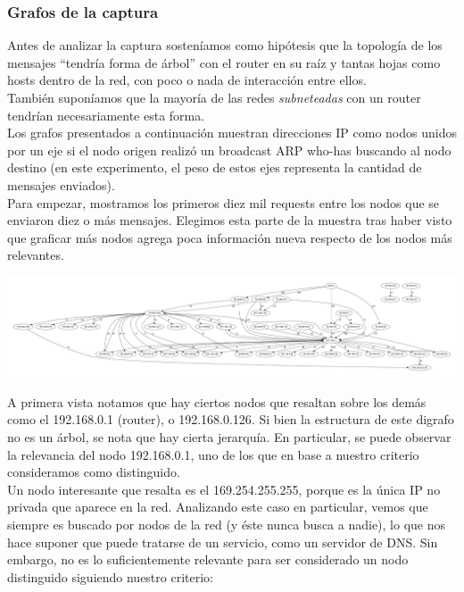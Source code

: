 \subsubsection{Grafos de la captura}

\indent \indent Antes de analizar la captura sosteníamos como hipótesis que la topología de los mensajes ``tendría forma de árbol'' con el router en su raíz y tantas hojas como hosts dentro de la red, con poco o nada de interacción entre ellos.\\
\indent También suponíamos que la mayoría de las redes \textit{subneteadas} con un router tendrían necesariamente esta forma.\\
\indent Los grafos presentados a continuación muestran direcciones IP como nodos unidos por un eje si el nodo origen realizó un broadcast ARP who-has buscando al nodo destino (en este experimento, el peso de estos ejes representa la cantidad de mensajes enviados).\\
\indent Para empezar, mostramos los primeros diez mil requests entre los nodos que se enviaron diez o más mensajes. Elegimos esta parte de la muestra tras haber visto que graficar más nodos agrega poca información nueva respecto de los nodos más relevantes.\\

\begin{center}
\includegraphics[scale=0.25,angle=90]{graphics/t-work-10000c-10w.png}
\end{center}

\indent A primera vista notamos que hay ciertos nodos que resaltan sobre los demás como el 192.168.0.1 (router), o 192.168.0.126. Si bien la estructura de este digrafo no es un árbol, se nota que hay cierta jerarquía. En particular, se puede observar la relevancia del nodo 192.168.0.1, uno de los que en base a nuestro criterio consideramos como distinguido.\\
\indent Un nodo interesante que resalta es el 169.254.255.255, porque es la única IP no privada que aparece en la red. Analizando este caso en particular, vemos que siempre es buscado por nodos de la red (y éste nunca busca a nadie), lo que nos hace suponer que puede tratarse de un servicio, como un servidor de DNS. Sin embargo, no es lo suficientemente relevante para ser considerado un nodo distinguido siguiendo nuestro criterio:\\

